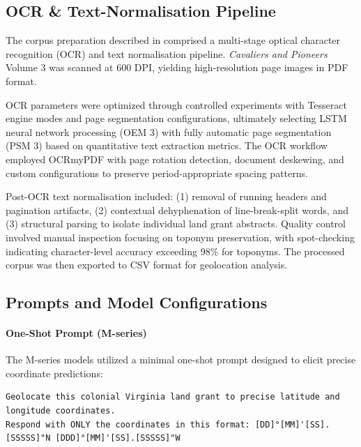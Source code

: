 \subsection{OCR \& Text-Normalisation
Pipeline}\label{a.1-ocr-text-normalisation-pipeline}

The corpus preparation described in \DIFdelbegin {}\DIFdelend \DIFaddbegin {} comprised a multi-stage
optical character recognition (OCR) and text normalisation pipeline.
\emph{Cavaliers and Pioneers} Volume 3 was scanned at 600 DPI, yielding
high-resolution page images in PDF format.

OCR parameters were optimized through controlled experiments with
Tesseract engine modes and page segmentation configurations, ultimately
selecting LSTM neural network processing (OEM 3) with fully automatic
page segmentation (PSM 3) based on quantitative text extraction metrics.
The OCR workflow employed OCRmyPDF with page rotation detection,
document deskewing, and custom configurations to preserve
period-appropriate spacing patterns.

Post-OCR text normalisation included: (1) removal of running headers and
pagination artifacts, (2) contextual dehyphenation of line-break-split
words, and (3) structural parsing to isolate individual land grant
abstracts. Quality control involved manual inspection focusing on
toponym preservation, with spot-checking indicating character-level
accuracy exceeding 98\% for toponyms. The processed corpus was then
exported to CSV format for geolocation analysis.

\subsection{Prompts and Model Configurations}\label{sec:prompts}

\paragraph{One-Shot Prompt
(M-series)}\label{a.2.1-one-shot-prompt-m-series}

The M-series models utilized a minimal one-shot prompt designed to
elicit precise coordinate predictions:

\begin{lstlisting}
Geolocate this colonial Virginia land grant to precise latitude and longitude coordinates.
Respond with ONLY the coordinates in this format: [DD]°[MM]'[SS].[SSSSS]"N [DDD]°[MM]'[SS].[SSSSS]"W
\end{lstlisting}

